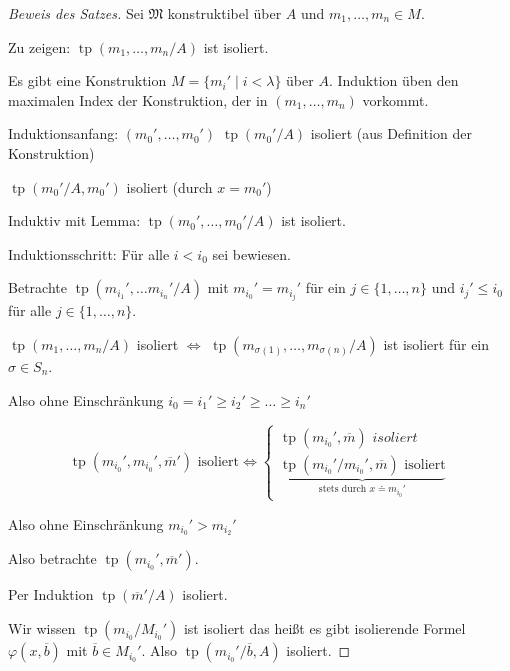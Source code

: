 \documentclass[12pt,parskip=full]{scrartcl}
\theoremstyle{definition}
\begin{document}
 	\begin{proof}[Beweis des Satzes]
 		Sei $\mathfrak{M}$ konstruktibel über $A$ und $m_1, \dots, m_n \in M$.
 		
 		Zu zeigen: $\operatorname{tp}(m_1, \dots, m_n/A)$ ist isoliert.
 		
 		Es gibt eine Konstruktion $M = \{ m_i' \mid i < \lambda \}$ über $A$. Induktion üben den maximalen Index der Konstruktion, der in $(m_1, \dots, m_n)$ vorkommt.
 		
 		Induktionsanfang: $(m_0', \dots, m_0')$ $\operatorname{tp}(m_0'/A)$ isoliert (aus Definition der Konstruktion)
 		
 		$\operatorname{tp}(m_0'/A, m_0')$ isoliert (durch $x = m_0'$)
 		
 		Induktiv mit Lemma: $\operatorname{tp}(m_0', \dots, m_0' / A)$ ist isoliert.
 		
 		Induktionsschritt: Für alle $i < i_0$ sei bewiesen.
 		
 		Betrachte $\operatorname{tp}(m_{i_1}', \dots m_{i_n}' / A)$ mit $m_{i_0}' = m_{i_j}'$ für ein $j \in \{ 1, \dots, n \}$ und $i_j' \leq i_0$ für alle $j \in \{ 1, \dots, n \}$.
 		
 		$\operatorname{tp}(m_1, \dots, m_n / A)$ isoliert $\Leftrightarrow$ $\operatorname{tp}(m_{\sigma(1)}, \dots, m_{\sigma(n)} / A)$ ist isoliert für ein $\sigma \in S_n$.
 		
 		Also ohne Einschränkung $i_0 = i_1' \geq i_2' \geq \dots \geq i_n'$
 		
 		\begin{equation*}
	 		\operatorname{tp}(m_{i_0}', m_{i_0}', \overline{m}') \text{ isoliert} \Leftrightarrow \begin{cases}
		 		\operatorname{tp}(m_{i_0}', \overline{m}) \textit{ isoliert} \\
		 		\underbrace{\operatorname{tp}(m_{i_0}' / m_{i_0}', \overline{m}) \text{ isoliert}}_\text{stets durch $x \doteq m_{i_0}'$}
	 		\end{cases}
 		\end{equation*}
 		
 		Also ohne Einschränkung $m_{i_0}' > m_{i_2}'$
 		
 		Also betrachte $\operatorname{tp}(m_{i_0}', \overline{m}')$.
 		
 		Per Induktion $\operatorname{tp}(\overline{m}'/A)$ isoliert.
 		
 		Wir wissen $\operatorname{tp}(m_{i_0} / M_{i_0}')$ ist isoliert das heißt es gibt isolierende Formel $\varphi(x, \overline{b})$ mit $\overline{b} \in M_{i_0}'$. Also $\operatorname{tp}(m_{i_0}' / \overline{b}, A)$ isoliert.
 		

\end{proof}
\end{document}
